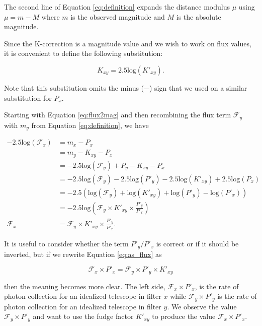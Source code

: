 \documentclass[linenumbers]{aastex631}
\begin{document}
\noindent The second line of Equation \ref{eq:definition} expands the distance modulus
$\mu$ using $\mu = m - M$ where $m$ is the observed magnitude and $M$ is the
absolute magnitude.

Since the K-correction is a magnitude value and we wish to work on flux values,
it is convenient to define the following substitution:

\begin{equation}
\label{eq:k_substitution}
  K_{xy} = 2.5\text{log}(K'_{xy}) .
\end{equation}

\noindent Note that this substitution omits the minus ($-$) sign that we used on a
similar substitution for $P_x$.

Starting with Equation \ref{eq:flux2mag} and then
recombining the flux term $\mathcal{F}_y$ with $m_y$ from Equation
\ref{eq:definition}, we have

\begin{equation}
\begin{aligned}
\label{eq:as_flux}
  -2.5 \text{log}(\mathcal{F}_x)
      &= m_x - P_x \\
      &= m_y - K_{xy} - P_x \\
      &= -2.5 \text{log}(\mathcal{F}_y) + P_y - K_{xy} - P_x \\
      &= -2.5 \text{log}(\mathcal{F}_y)
         - 2.5 \text{log}(P'_y)
         - 2.5 \text{log}(K'_{xy})
         + 2.5 \text{log}(P_x) \\
      &= -2.5 \left(
         \text{log}(\mathcal{F}_y)
         + \text{log}(K'_{xy})
         + \text{log}(P'_y)
         - \text{log}(P'_x)
        \right) \\
      &= -2.5 \text{log}\left(
        \mathcal{F}_y
        \times K'_{xy}
        \times \frac{P'_y}{P'_x}\right) \\
  \mathcal{F}_x &= \mathcal{F}_y \times K'_{xy} \times \frac{P'_y}{P'_x}.
\end{aligned}
\end{equation}

It is useful to consider whether the term $P'_y / P'_x$ is correct or if
it should be inverted, but if we rewrite Equation \ref{eq:as_flux} as

\begin{equation}
  \mathcal{F}_x \times P'_x = \mathcal{F}_y \times P'_y \times K'_{xy}
\end{equation}

\noindent then the meaning becomes more clear. The left side, $\mathcal{F}_x
\times P'_x$, is the rate of photon collection for an idealized telescope in
filter $x$ while $\mathcal{F}_y \times P'_y$ is the rate of photon collection
for an idealized telescope in filter $y$. We observe the value $\mathcal{F}_y
\times P'_y$ and want to use the fudge factor $K'_{xy}$ to produce the value
$\mathcal{F}_x \times P'_x$.
\end{document}
